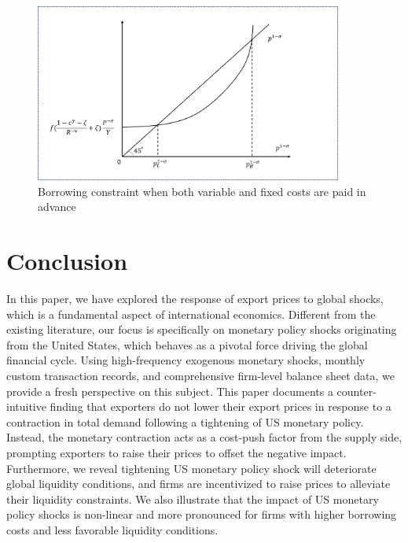 \begin{figure}[H]
     \centering
         \includegraphics[width=0.9\textwidth]{latex/drafts/pic/fixed_cost.png}
         \caption{\small Borrowing constraint when both variable and fixed costs are paid in advance}
         \label{fig: fixed_cost}
\end{figure}


\newpage
\section{Conclusion}

In this paper, we have explored the response of export prices to global shocks, which is a fundamental aspect of international economics. Different from the existing literature, our focus is specifically on monetary policy shocks originating from the United States, which behaves as a pivotal force driving the global financial cycle. Using high-frequency exogenous monetary shocks, monthly custom transaction records, and comprehensive firm-level balance sheet data, we provide a fresh perspective on this subject. This paper documents a counter-intuitive finding that exporters do not lower their export prices in response to a contraction in total demand following a tightening of US monetary policy. Instead, the monetary contraction acts as a cost-push factor from the supply side, prompting exporters to raise their prices to offset the negative impact. Furthermore, we reveal tightening US monetary policy shock will deteriorate global liquidity conditions, and firms are incentivized to raise prices to alleviate their liquidity constraints. We also illustrate that the impact of US monetary policy shocks is non-linear and more pronounced for firms with higher borrowing costs and less favorable liquidity conditions.

